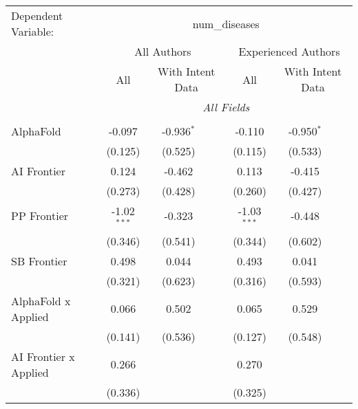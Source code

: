 \begingroup
\centering
\begin{tabular}{lcccccc}
   \tabularnewline \midrule \midrule
   Dependent Variable: & \multicolumn{6}{c}{num\_diseases}\\
 & \multicolumn{3}{c}{All Authors} & \multicolumn{3}{c}{Experienced Authors} \\
\cmidrule(lr){2-4} \cmidrule(lr){5-7}
 & \multicolumn{1}{c}{All} & \multicolumn{2}{c}{With Intent Data} & \multicolumn{1}{c}{All} & \multicolumn{2}{c}{With Intent Data} \\
\cmidrule(lr){2-2} \cmidrule(lr){3-4} \cmidrule(lr){5-5} \cmidrule(lr){6-7}
 & \multicolumn{6}{c}{\textit{All Fields}} \\ \\
   AlphaFold                    & -0.097        & -0.936$^{*}$ &              & -0.110        & -0.950$^{*}$ &   \\   
                                & (0.125)       & (0.525)      &              & (0.115)       & (0.533)      &   \\   
   AI Frontier                  & 0.124         & -0.462       &              & 0.113         & -0.415       &   \\   
                                & (0.273)       & (0.428)      &              & (0.260)       & (0.427)      &   \\   
   PP Frontier                  & -1.02$^{***}$ & -0.323       &              & -1.03$^{***}$ & -0.448       &   \\   
                                & (0.346)       & (0.541)      &              & (0.344)       & (0.602)      &   \\   
   SB Frontier                  & 0.498         & 0.044        &              & 0.493         & 0.041        &   \\   
                                & (0.321)       & (0.623)      &              & (0.316)       & (0.593)      &   \\   
   AlphaFold x Applied          & 0.066         & 0.502        &              & 0.065         & 0.529        &   \\   
                                & (0.141)       & (0.536)      &              & (0.127)       & (0.548)      &   \\   
   AI Frontier x Applied        & 0.266         &              &              & 0.270         &              &   \\   
                                & (0.336)       &              &              & (0.325)       &              &   \\   

\end{tabular}

